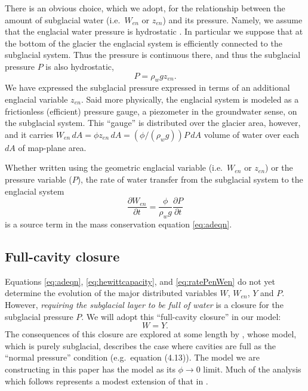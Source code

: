 \documentclass[11pt,final]{amsart}%
\begin{document}
There is an obvious choice, which we adopt, for the relationship between the amount of subglacial water (i.e.~$W_{en}$ or $z_{en}$) and its pressure.  Namely, we assume that the englacial water pressure is hydrostatic \citep{Bartholomausetal2011}.  In particular we suppose that at the bottom of the glacier the englacial system is efficiently connected to the subglacial system.  Thus the pressure is continuous there, and thus the subglacial pressure $P$ is also hydrostatic,
\begin{equation}
P = \rho_w g z_{en}. \label{eq:Penhydrostatic}
\end{equation}
We have expressed the subglacial pressure expressed in terms of an additional englacial variable $z_{en}$.  Said more physically, the englacial system is modeled as a frictionless (efficient) pressure gauge, a piezometer in the groundwater sense, on the subglacial system.  This ``gauge'' is distributed over the glacier area, however, and it carries $W_{en}\, dA = \phi z_{en}\, dA = (\phi/(\rho_w g)) P\, dA$ volume of water over each $dA$ of map-plane area.

Whether written using the geometric englacial variable (i.e.~$W_{en}$ or $z_{en}$) or the pressure variable ($P$), the rate of water transfer from the subglacial system to the englacial system
\begin{equation}
\frac{\partial W_{en}}{\partial t} = \frac{\phi}{\rho_w g} \frac{\partial P}{\partial t} \label{eq:ratePenWen}
\end{equation}
is a source term in the mass conservation equation \eqref{eq:adeqn}.

\subsection*{Full-cavity closure}  Equations  \eqref{eq:adeqn}, \eqref{eq:hewittcapacity}, and \eqref{eq:ratePenWen} do not yet determine the evolution of the major distributed variables $W$, $W_{en}$, $Y$ and $P$.  However, \emph{requiring the subglacial layer to be full of water} is a closure for the subglacial pressure $P$.  We will adopt this ``full-cavity closure'' in our model:
\begin{equation}
W = Y.\label{eq:strongclosure}
\end{equation}
The consequences of this closure are explored at some length by \cite{Schoofetal2012}, whose model, which is purely subglacial, describes the case where cavities are full as the ``normal pressure'' condition (e.g.~equation (4.13)).  The model we are constructing in this paper has the \cite{Schoofetal2012} model as its $\phi\to 0$ limit.    Much of the analysis which follows represents a modest extension of that in \cite{Schoofetal2012}.
\end{document}
